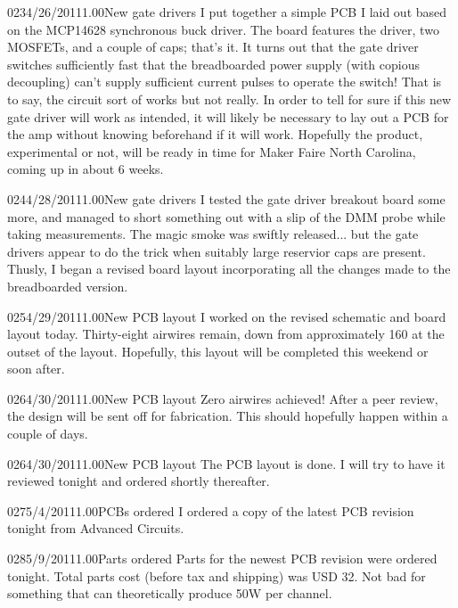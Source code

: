\documentclass[12pt,letterpaper,onecolumn]{article}
\begin{document}
\begin{nbentry}{023}{4/26/2011}{1.00}{New gate drivers}
I put together a simple PCB I laid out based on the MCP14628 synchronous buck driver.  The board features the driver, two MOSFETs, and a couple of caps; that's it.  It turns out that the gate driver switches sufficiently fast that the breadboarded power supply (with copious decoupling) can't supply sufficient current pulses to operate the switch!  That is to say, the circuit sort of works but not really.  In order to tell for sure if this new gate driver will work as intended, it will likely be necessary to lay out a PCB for the amp without knowing beforehand if it will work.  Hopefully the product, experimental or not, will be ready in time for Maker Faire North Carolina, coming up in about 6 weeks.
\end{nbentry}

\begin{nbentry}{024}{4/28/2011}{1.00}{New gate drivers}
I tested the gate driver breakout board some more, and managed to short something out with a slip of the DMM probe while taking measurements.  The magic smoke was swiftly released... but the gate drivers appear to do the trick when suitably large reservior caps are present.  Thusly, I began a revised board layout incorporating all the changes made to the breadboarded version.
\end{nbentry}

\begin{nbentry}{025}{4/29/2011}{1.00}{New PCB layout}
I worked on the revised schematic and board layout today.  Thirty-eight airwires remain, down from approximately 160 at the outset of the layout.  Hopefully, this layout will be completed this weekend or soon after.
\end{nbentry}

\begin{nbentry}{026}{4/30/2011}{1.00}{New PCB layout}
Zero airwires achieved!  After a peer review, the design will be sent off for fabrication.  This should hopefully happen within a couple of days.
\end{nbentry}

\begin{nbentry}{026}{4/30/2011}{1.00}{New PCB layout}
The PCB layout is done.  I will try to have it reviewed tonight and ordered shortly thereafter.
\end{nbentry}

\begin{nbentry}{027}{5/4/2011}{1.00}{PCBs ordered}
I ordered a copy of the latest PCB revision tonight from Advanced Circuits.
\end{nbentry}

\begin{nbentry}{028}{5/9/2011}{1.00}{Parts ordered}
Parts for the newest PCB revision were ordered tonight.  Total parts cost (before tax and shipping) was USD 32.  Not bad for something that can theoretically produce 50W per channel.
\end{nbentry}
\end{document}
